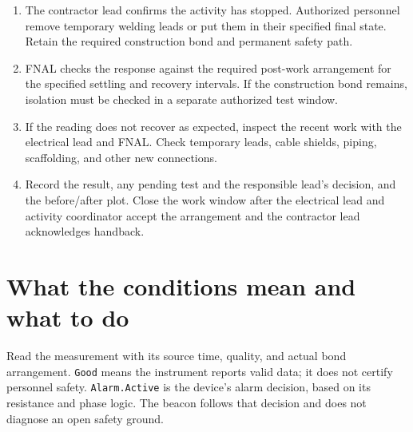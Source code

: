 \documentclass[11pt]{article}
\begin{document}
\begin{enumerate}
  \item The contractor lead confirms the activity has stopped. Authorized personnel remove temporary welding leads or put them in their specified final state. Retain the required construction bond and permanent safety path.
  \item FNAL checks the response against the required post-work arrangement for the specified settling and recovery intervals. If the construction bond remains, isolation must be checked in a separate authorized test window.
  \item If the reading does not recover as expected, inspect the recent work with the electrical lead and FNAL. Check temporary leads, cable shields, piping, scaffolding, and other new connections.
  \item Record the result, any pending test and the responsible lead's decision, and the before/after plot. Close the work window after the electrical lead and activity coordinator accept the arrangement and the contractor lead acknowledges handback.
\end{enumerate}

\section{What the conditions mean and what to do}
\label{sec:response}

Read the measurement with its source time, quality, and actual bond arrangement. \texttt{Good} means the instrument reports valid data; it does not certify personnel safety. \texttt{Alarm.Active} is the device's alarm decision, based on its resistance and phase logic. The beacon follows that decision and does not diagnose an open safety ground.
\end{document}
